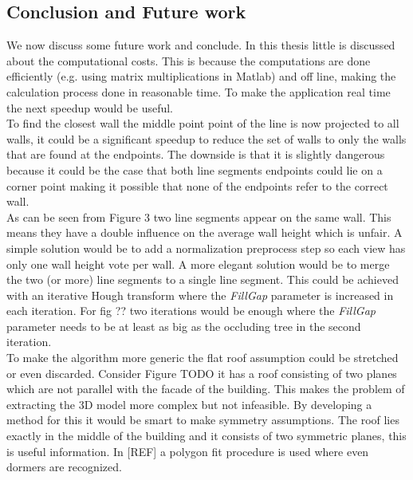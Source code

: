 \documentclass[10pt]{article}
\begin{document}
\subsection{Conclusion and Future work}
We now discuss some future work and conclude.  In this thesis little is discussed about the computational costs. This is because the computations are done efficiently (e.g. using matrix multiplications in Matlab) and off line, making the calculation process done in reasonable time. To make the application real time the next speedup would be useful.\\
To find the closest wall the middle point point of the line is now projected to all walls, it could be a significant speedup to reduce the set of walls to only the walls that are found at the endpoints. The downside is that it is slightly dangerous because it could be the case that both line segments endpoints could lie on a corner point making it possible that none of the endpoints refer to the correct wall.\\

As can be seen from Figure 3
two line segments appear on the same wall. This means they have a double influence on the average wall height which is unfair. A simple solution would be to add a normalization preprocess step so each view has only one wall height vote per wall. A more elegant solution would be to merge the two (or more) line segments to a single line segment. This could be achieved with an iterative Hough transform where the \emph{FillGap} parameter is increased in each iteration. For fig ?? %
two iterations would be enough where the \emph{FillGap} parameter needs to be at least as big as the occluding tree in the second iteration.\\
To make the algorithm more generic the flat roof assumption could be stretched or even discarded.
Consider Figure TODO %
it has a roof consisting of two planes which are not parallel with the facade of the building. This makes the problem of extracting the 3D model more complex but not 
infeasible. By developing a method for this it would be smart to make symmetry assumptions. The roof lies exactly in the middle of the building and it consists of two symmetric planes, this is useful information. In 
[REF] a polygon fit procedure is used where even dormers are recognized.\\
\end{document}
